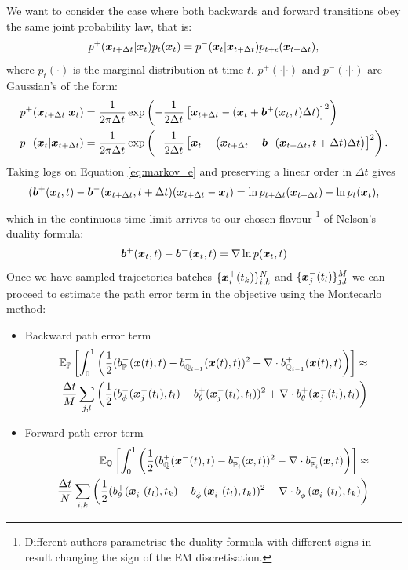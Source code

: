 \documentclass[a4paper,12pt,twoside,openright]{report}
\theoremstyle{definition}
\begin{document}
We want to consider the case where both backwards and forward transitions  obey the same joint probability law, that is:
\begin{align}\label{eq:markov_e}
    p^{+}({\bm{x}}_{t+\Delta t}|{\bm{x}}_t)p_t({\bm{x}}_t)=p^{-}({\bm{x}}_t|{\bm{x}}_{t+\Delta t})p_{t+\epsilon}({\bm{x}}_{t+\Delta t}),
\end{align}
where $p_t(\cdot)$ is the marginal distribution at time $t$. $p^{+}(\cdot|\cdot)$ and $p^{-}(\cdot|\cdot)$ are Gaussian's of the form:
\begin{align*}
p^{+}({\bm{x}}_{t+\Delta t}|{\bm{x}}_t)&=\frac{1}{2\pi \Delta t }\exp\left(-\frac{1}{2\Delta t}\left[{\bm{x}}_{t+\Delta t}-({\bm{x}}_t+{\bm{b}}^{+}({\bm{x}}_t,t)\Delta t)\right]^2\right) \\
p^{-}({\bm{x}}_t|{\bm{x}}_{t+\Delta t})&=\frac{1}{2\pi \Delta t}\exp\left(-\frac{1}{2\Delta t}\left[{\bm{x}}_t-\left({\bm{x}}_{t+\Delta t}-{\bm{b}}^{-}({\bm{x}}_{t+\Delta t},t+\Delta t)\Delta t\right)\right]^2\right).
\end{align*}
Taking logs on Equation \ref{eq:markov_e} and preserving a linear order in $\Delta t$ gives
\begin{align*}
    ({\bm{b}}^+({\bm{x}}_t,t)-{\bm{b}}^-({\bm{x}}_{t+\Delta t},t+\Delta t)({\bm{x}}_{t+\Delta t}-{\bm{x}}_t)=\operatorname{ln} p_{t+\Delta t}({\bm{x}}_{t+\Delta t}) - \operatorname{ln} p_t({\bm{x}}_t), 
\end{align*}
which in the continuous time limit arrives to our chosen flavour \footnote{Different authors parametrise the duality formula with different signs in result changing the sign of the EM discretisation.} of Nelson's duality formula:
\begin{align*}
      {\bm{b}}^+({\bm{x}}_t,t) -{\bm{b}}^-({\bm{x}}_t,t) = \nabla\operatorname{ln} p({\bm{x}}_t, t)
\end{align*}
Once we have sampled trajectories batches $\{{\bm{x}}^{+}_i(t_k)\}_{i,k}^N$ and $\{{\bm{x}}^{-}_j(t_l)\}_{j,l}^M$ we can proceed to estimate the path error term in the objective using the Montecarlo method:


\begin{itemize}
    \item Backward path error term 
\begin{align}
    \mathbb{E}_{{\mathbb{P}}}\left[\int_0^1 \left(\frac{1}{2}(b_{\mathbb{P}}^{-}({\bm{x}}(t),t) - b_{{\mathbb{Q}}_{i-1}}^{+}({\bm{x}}(t),t))^2 + \nabla\cdot b^{+}_{{\mathbb{Q}}_{i-1}}({\bm{x}}(t),t) \right)\right] \approx \nonumber   \\
    \frac{\Delta t}{M} \sum_{j,l}\left(\frac{1}{2}(b_\phi^{-}({\bm{x}}^{-}_j(t_l), t_l) - b_{\theta}^{+}({\bm{x}}^{-}_j(t_l), t_l))^2 + \nabla\cdot b^{+}_{\theta}({\bm{x}}^{-}_j(t_l), t_l)\right)
\end{align}
    \item Forward path error term
\begin{align}
    \mathbb{E}_{{\mathbb{Q}}}\left[\int_0^1 \left(\frac{1}{2}(b_{\mathbb{Q}}^{+}({\bm{x}}^{-}(t), t) - b_{{\mathbb{P}}_{i}}^{-}({\bm{x}}, t))^2 - \nabla\cdot b^{-}_{{\mathbb{P}}_{i}}({\bm{x}}, t) \right)\right]  \approx \nonumber   \\
    \frac{\Delta t}{N} \sum_{i,k}\left(\frac{1}{2}(b_\theta^{+}({\bm{x}}^{-}_i(t_l), t_k) - b_{\phi}^{-}({\bm{x}}^{-}_i(t_l), t_k))^2 - \nabla\cdot b^{-}_{\phi}({\bm{x}}^{-}_i(t_l), t_k)\right)
\end{align}
\end{itemize}
\end{document}
